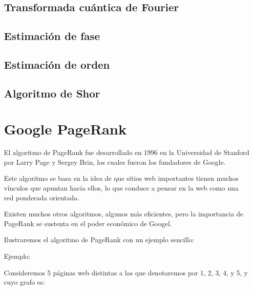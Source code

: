 \documentclass[11pt, spanish]{report}
\begin{document}
\section{Transformada cuántica de Fourier}

\section{Estimación de fase}

\section{Estimación de orden}

\section{Algoritmo de Shor}

\chapter{Google PageRank}

El algoritmo de PageRank fue desarrollado en 1996 en la Universidad de Stanford por Larry Page y Sergey Brin, los cuales fueron los fundadores de Google.

Este algoritmo se basa en la idea de que sitios web importantes tienen muchos vínculos que apuntan hacia ellos, lo que conduce a pensar en la web como una red ponderada orientada.

Existen muchos otros algoritmos, algunos más eficientes, pero la importancia de PageRank se sustenta en el poder económico de Googel.

Ilustraremos el algoritmo de PageRank con un ejemplo sencillo:

Ejemplo:

Consideremos 5 páginas web distintas a las que denotaremos por 1, 2, 3, 4, y 5, y cuyo grafo es:
\vspace{3cm}
\end{document}
